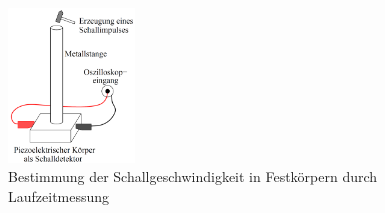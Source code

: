 \begin{figure}
\begin{center}
\includegraphics[width=0.3\textwidth]{Bilder/Versuchsaufbau2.png}
\caption{Bestimmung der Schallgeschwindigkeit in Festkörpern durch Laufzeitmessung}
\label{fig:versuch2}
\end{center}
\end{figure}